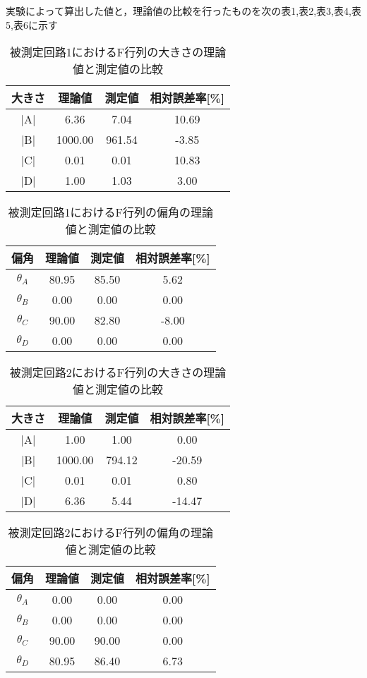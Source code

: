 実験によって算出した値と，理論値の比較を行ったものを次の表1,表2,表3,表4,表5,表6に示す

\begin{table}[!ht]
    \centering
    \caption{被測定回路1におけるF行列の大きさの理論値と測定値の比較}
    \begin{tabular}{c|ccc}
    \hline
        大きさ & 理論値 & 測定値 & 相対誤差率[\%] \\ \hline
        |A| & 6.36 & 7.04 & 10.69 \\ 
        |B| & 1000.00 & 961.54 & -3.85 \\ 
        |C| & 0.01 & 0.01 & 10.83 \\ 
        |D| & 1.00 & 1.03 & 3.00 \\ 
    \end{tabular}
\end{table}

\begin{table}[!ht]
    \centering
    \caption{被測定回路1におけるF行列の偏角の理論値と測定値の比較}
    \begin{tabular}{c|ccc}
    \hline
        偏角 & 理論値 & 測定値 & 相対誤差率[\%] \\ \hline
        $\theta_A$ & 80.95 & 85.50 & 5.62 \\ 
        $\theta_B$ & 0.00 & 0.00 & 0.00 \\ 
        $\theta_C$ & 90.00 & 82.80 & -8.00 \\
        $\theta_D$ & 0.00 & 0.00 & 0.00 \\
    \end{tabular}
\end{table}

\begin{table}[!ht]
    \centering
    \caption{被測定回路2におけるF行列の大きさの理論値と測定値の比較}
    \begin{tabular}{c|ccc}
    \hline
        大きさ & 理論値 & 測定値 & 相対誤差率[\%] \\ \hline
        |A| & 1.00 & 1.00 & 0.00 \\ 
        |B| & 1000.00 & 794.12 & -20.59 \\ 
        |C| & 0.01 & 0.01 & 0.80 \\ 
        |D| & 6.36 & 5.44 & -14.47 \\ 
    \end{tabular}
\end{table}

\begin{table}[!ht]
    \centering
    \caption{被測定回路2におけるF行列の偏角の理論値と測定値の比較}
    \begin{tabular}{c|ccc}
    \hline
        偏角 & 理論値 & 測定値 & 相対誤差率[\%] \\ \hline
        $\theta_A$ & 0.00 & 0.00 & 0.00 \\ 
        $\theta_B$ & 0.00 & 0.00 & 0.00 \\ 
        $\theta_C$ & 90.00 & 90.00 & 0.00 \\
        $\theta_D$ & 80.95 & 86.40 & 6.73 \\
    \end{tabular}
\end{table}

